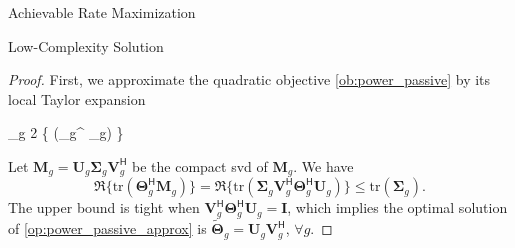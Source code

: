 \documentclass[journal]{IEEEtran}
\begin{document}
\begin{section}{Achievable Rate Maximization}
\begin{subsection}{Low-Complexity Solution}
\begin{proof}
			First, we approximate the quadratic objective \eqref{ob:power_passive} by its local Taylor expansion
			\begin{maxi!}
				{\scriptstyle{\mathbf{\Theta}}}{\sum_g 2 \Re\bigl\{ (\mathbf{\Theta}_g^ _g) \bigr\}}{\label{op:power_passive_approx}}{\label{ob:power_passive_approx}}
			\end{maxi!}
			Let $\mathbf{M}_g = \mathbf{U}_g \mathbf{\Sigma}_g \mathbf{V}_g^\mathsf{H}$ be the compact \gls{svd} of $\mathbf{M}_g$.
			We have
			\begin{equation}
				\Re \bigl\{\mathrm{tr}(\mathbf{\Theta}_g^\mathsf{H} \mathbf{M}_g)\bigr\} = \Re \bigl\{ \mathrm{tr}(\mathbf{\Sigma}_g \mathbf{V}_g^\mathsf{H} \mathbf{\Theta}_g^\mathsf{H} \mathbf{U}_g) \bigr\} \le \mathrm{tr}(\mathbf{\Sigma}_g).
			\end{equation}
			The upper bound is tight when $\mathbf{V}_g^\mathsf{H} \mathbf{\Theta}_g^\mathsf{H} \mathbf{U}_g = \mathbf{I}$, which implies the optimal solution of \eqref{op:power_passive_approx} is $\tilde{\mathbf{\Theta}}_g = \mathbf{U}_g \mathbf{V}_g^\mathsf{H}$, $\forall g$.


\end{proof}
\end{subsection}
\end{section}
\end{document}
